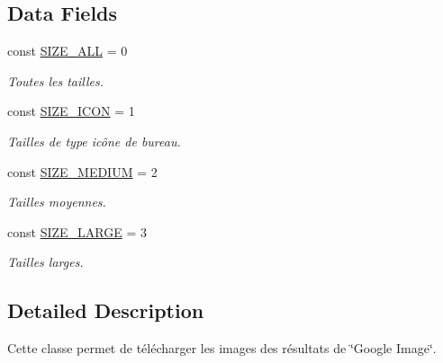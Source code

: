 \subsection*{Data Fields}
\begin{DoxyCompactItemize}
\item 
\hypertarget{class_google_image_abafee20a240b78759837b9ecdc6a8ee1}{const \hyperlink{class_google_image_abafee20a240b78759837b9ecdc6a8ee1}{S\-I\-Z\-E\-\_\-\-A\-L\-L} = 0}\label{class_google_image_abafee20a240b78759837b9ecdc6a8ee1}

\begin{DoxyCompactList}\small\item\em Toutes les tailles. \end{DoxyCompactList}\item 
\hypertarget{class_google_image_a161af60b05bf26e7a5077178c3b4b5b6}{const \hyperlink{class_google_image_a161af60b05bf26e7a5077178c3b4b5b6}{S\-I\-Z\-E\-\_\-\-I\-C\-O\-N} = 1}\label{class_google_image_a161af60b05bf26e7a5077178c3b4b5b6}

\begin{DoxyCompactList}\small\item\em Tailles de type icône de bureau. \end{DoxyCompactList}\item 
\hypertarget{class_google_image_a0951e5a9a339649b79e8eeb68fbc21e8}{const \hyperlink{class_google_image_a0951e5a9a339649b79e8eeb68fbc21e8}{S\-I\-Z\-E\-\_\-\-M\-E\-D\-I\-U\-M} = 2}\label{class_google_image_a0951e5a9a339649b79e8eeb68fbc21e8}

\begin{DoxyCompactList}\small\item\em Tailles moyennes. \end{DoxyCompactList}\item 
\hypertarget{class_google_image_a16c410ead77a2d9ffe8e57980323543e}{const \hyperlink{class_google_image_a16c410ead77a2d9ffe8e57980323543e}{S\-I\-Z\-E\-\_\-\-L\-A\-R\-G\-E} = 3}\label{class_google_image_a16c410ead77a2d9ffe8e57980323543e}

\begin{DoxyCompactList}\small\item\em Tailles larges. \end{DoxyCompactList}\end{DoxyCompactItemize}


\subsection{Detailed Description}
Cette classe permet de télécharger les images des résultats de \char`\"{}\-Google Image\char`\"{}. 

